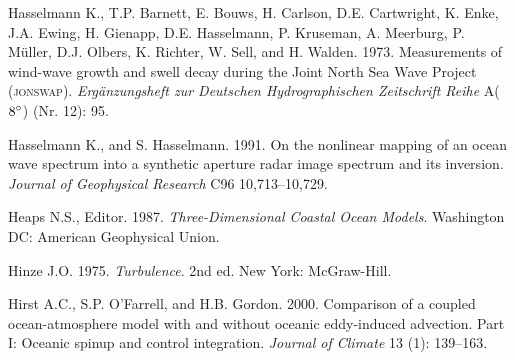 \begin{thebibliography}{999}
Hasselmann K., T.P. Barnett, E. Bouws, H. Carlson, D.E. Cartwright, K.
Enke, J.A. Ewing, H. Gienapp, D.E. Hasselmann, P. Kruseman,
A. Meerburg, P.  M\"{u}ller, D.J. Olbers, K. Richter, W. Sell, and
H. Walden. 1973. Measurements of wind-wave growth and swell decay
during the Joint North Sea Wave Project
(\textsc{jonswap}). \textit{Erg\"{a}nzungsheft zur Deutschen
  Hydrographischen Zeitschrift Reihe} A(${8}^\circ$) (Nr. 12): 95.
%

Hasselmann K., and S. Hasselmann.  1991. On the nonlinear mapping of
an ocean wave spectrum into a synthetic aperture radar image spectrum
and its inversion. \textit{Journal of Geophysical Research} C96
10,713--10,729.
%

Heaps N.S., Editor.  1987. \textit{Three-Dimensional Coastal Ocean
  Models}.  Washington DC: American Geophysical Union.
%

Hinze J.O.  1975. \textit{Turbulence}. 2nd ed. New York: McGraw-Hill.
%

Hirst A.C., S.P. O'Farrell, and H.B. Gordon. 2000. Comparison of a
coupled ocean-atmosphere model with and without oceanic eddy-induced
advection.  Part I: Oceanic spinup and control
integration. \textit{Journal of Climate} 13 (1): 139--163.
%


\end{thebibliography}

